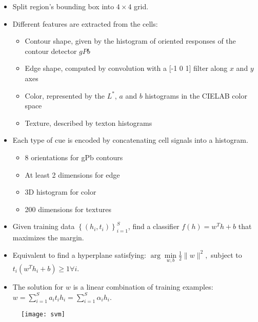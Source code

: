 \documentclass[11pt, a4paper, landscape]{article}
\begin{document}
\NewPage{}
\vfill
\begin{itemize}
\item Split region's bounding box into $4 \times 4$ grid.
\item Different features are extracted from the cells:
\begin{itemize}
\item Contour shape, given by the histogram of oriented responses of the contour detector $gPb$
\item Edge shape, computed by convolution with a [-1 0 1] filter along $x$ and $y$ axes
\item Color, represented by the $L^*$, $a$ and $b$ histograms in the CIELAB color space
\item Texture, described by texton histograms
\end{itemize}
\item Each type of cue is encoded by concatenating cell signals into a histogram.
\begin{itemize}
\item 8 orientations for gPb contours
\item At least 2 dimensions for edge
\item 3D histogram for color
\item 200 dimensions for textures
\end{itemize}
\end{itemize}
\vfill


\NewPage{}
\vfill
\begin{itemize}
\item Given training data $\left\lbrace (h_i, t_i) \right\rbrace _{i = 1} ^S$, find a classifier $f(h) = w^Th + b$ that maximizes the margin.
\vfill
\item Equivalent to find a hyperplane satisfying: $\arg\min\limits_{w, b} \frac{1}{2} \|w\| ^2,$ subject to $t_i(w^Th_i + b) \geq 1 \forall i$.
\vfill
\item The solution for $w$ is a linear combination of training examples: $w = \sum\limits_{i = 1}^{S} a_it_ih_i = \sum\limits_{i = 1}^{S} \alpha_ih_i$.
\end{itemize}
\begin{figure}
	\centering
	\texttt{[image: svm]}
\end{figure}
\vfill
\end{document}
